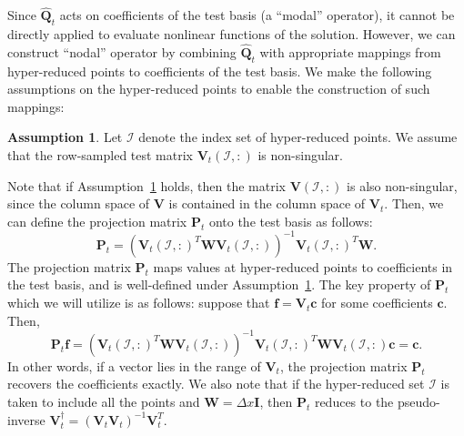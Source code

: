 \documentclass[preprint,10pt]{elsarticle}
\theoremstyle{definition}
\theoremstyle{lemma}
\theoremstyle{theorem}
\theoremstyle{assumption}
\newtheorem{assumption}{Assumption}
\renewcommand{\hat}{\widehat}
\newcommand{\LRp}[1]{\left( #1 \right)}
\begin{document}

Since $\hat{\bm{Q}}_{t}$ acts on coefficients of the test basis (a ``modal'' operator), it cannot be directly applied to evaluate nonlinear functions of the solution.  However, we can construct ``nodal'' operator by combining $\hat{\bm{Q}}_t$ with appropriate mappings from hyper-reduced points to coefficients of the test basis.  We make the following assumptions on the hyper-reduced points to enable the construction of such mappings: 
\begin{assumption}
Let $\mathcal{I}$ denote the index set of hyper-reduced points.  We assume that the row-sampled test matrix $\bm{V}_t\LRp{\mathcal{I},:}$ is non-singular.  
 \label{ass:quad}
\end{assumption}
Note that if Assumption~\ref{ass:quad} holds, then the matrix $\bm{V}\LRp{\mathcal{I},:}$ is also non-singular, since the column space of $\bm{V}$ is contained in the column space of $\bm{V}_t$.  Then, we can define the projection matrix $\bm{P}_t$ onto the test basis as follows:
\[
\bm{P}_t = \LRp{\bm{V}_t\LRp{\mathcal{I},:}^T\bm{W}\bm{V}_t\LRp{\mathcal{I},:}}^{-1}\bm{V}_t\LRp{\mathcal{I},:}^T\bm{W}.
\]
The projection matrix $\bm{P}_t$ maps values at hyper-reduced points to coefficients in the test basis, and is well-defined under Assumption~\ref{ass:quad}.  The key property of $\bm{P}_t$ which we will utilize is as follows: suppose that $\bm{f} = \bm{V}_t\bm{c}$ for some coefficients $\bm{c}$.  Then,
\begin{equation}
\bm{P}_t \bm{f} = \LRp{\bm{V}_t\LRp{\mathcal{I},:}^T\bm{W}\bm{V}_t\LRp{\mathcal{I},:}}^{-1}\bm{V}_t\LRp{\mathcal{I},:}^T\bm{W} \bm{V}_t\LRp{\mathcal{I},:}\bm{c} = \bm{c}.
\label{eq:preproduce}
\end{equation}
In other words, if a vector lies in the range of $\bm{V}_t$, the projection matrix $\bm{P}_t$ recovers the coefficients exactly.  We also note that if the hyper-reduced set $\mathcal{I}$ is taken to include all the points and $\bm{W} = \Delta x\bm{I}$, then $\bm{P}_t$ reduces to the pseudo-inverse $\bm{V}_t^{\dagger} = \LRp{\bm{V}_t\bm{V}_t}^{-1}\bm{V}_t^T$.  
\end{document}
